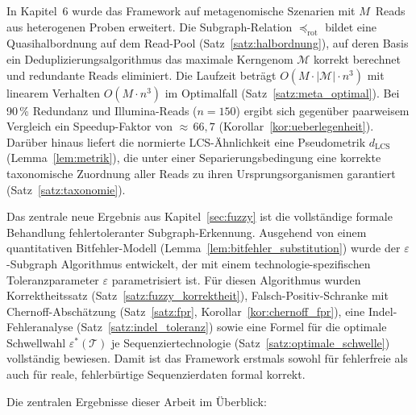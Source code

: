 ﻿\documentclass[a4paper,12pt]{article}
\theoremstyle{definition}
\begin{document}
In Kapitel~6 wurde das Framework auf metagenomische Szenarien mit $M$~Reads
aus heterogenen Proben erweitert. Die Subgraph-Relation $\preceq_{\mathrm{rot}}$
bildet eine Quasihalbordnung auf dem Read-Pool (Satz~\ref{satz:halbordnung}),
auf deren Basis ein Deduplizierungsalgorithmus das maximale Kerngenom
$\mathcal{M}$ korrekt berechnet und redundante Reads eliminiert. Die Laufzeit
betr\"{a}gt $O(M \cdot |\mathcal{M}| \cdot n^3)$ mit linearem Verhalten
$O(M \cdot n^3)$ im Optimalfall (Satz~\ref{satz:meta_optimal}). Bei
90\,\% Redundanz und Illumina-Reads ($n = 150$) ergibt sich gegen\"{u}ber
paarweisem Vergleich ein Speedup-Faktor von ${\approx}\,66{,}7$
(Korollar~\ref{kor:ueberlegenheit}). Dar\"{u}ber hinaus liefert die
normierte LCS-\"{A}hnlichkeit eine Pseudometrik $d_{\mathrm{LCS}}$
(Lemma~\ref{lem:metrik}), die unter einer Separierungsbedingung eine
korrekte taxonomische Zuordnung aller Reads zu ihren Ursprungsorganismen
garantiert (Satz~\ref{satz:taxonomie}).

Das zentrale neue Ergebnis aus Kapitel~\ref{sec:fuzzy} ist die vollst\"{a}ndige
formale Behandlung fehlertoleranter Subgraph-Erkennung. Ausgehend von
einem quantitativen Bitfehler-Modell (Lemma~\ref{lem:bitfehler_substitution})
wurde der $\varepsilon$-Subgraph Algorithmus entwickelt, der mit einem
technologie-spezifischen Toleranzparameter $\varepsilon$ parametrisiert ist.
F\"{u}r diesen Algorithmus wurden Korrektheitssatz
(Satz~\ref{satz:fuzzy_korrektheit}), Falsch-Positiv-Schranke mit
Chernoff-Absch\"{a}tzung (Satz~\ref{satz:fpr},
Korollar~\ref{kor:chernoff_fpr}), eine Indel-Fehleranalyse
(Satz~\ref{satz:indel_toleranz}) sowie eine Formel f\"{u}r die optimale
Schwellwahl $\varepsilon^*(\mathcal{T})$ je Sequenziertechnologie
(Satz~\ref{satz:optimale_schwelle}) vollst\"{a}ndig bewiesen. Damit ist das
Framework erstmals sowohl f\"{u}r fehlerfreie als auch f\"{u}r reale,
fehlerb\"{u}rtige Sequenzierdaten formal korrekt.

Die zentralen Ergebnisse dieser Arbeit im \"{U}berblick:
\end{document}
